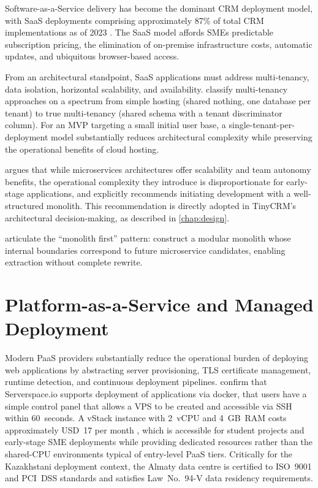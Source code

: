 Software-as-a-Service delivery has become the dominant CRM deployment
model, with SaaS deployments comprising approximately 87\% of total CRM
implementations as of 2023 \citep{gartner2023crm}. The SaaS model affords
SMEs predictable subscription pricing, the elimination of on-premise
infrastructure costs, automatic updates, and ubiquitous browser-based
access.

From an architectural standpoint, SaaS applications must address
multi-tenancy, data isolation, horizontal scalability, and availability.
\citet{bezemer2010} classify multi-tenancy approaches on a spectrum from
simple hosting (shared nothing, one database per tenant) to true
multi-tenancy (shared schema with a tenant discriminator column). For an
MVP targeting a small initial user base, a single-tenant-per-deployment
model substantially reduces architectural complexity while preserving the
operational benefits of cloud hosting.

\citet{richardson2018} argues that while microservices architectures offer
scalability and team autonomy benefits, the operational complexity they
introduce is disproportionate for early-stage applications, and explicitly
recommends initiating development with a well-structured monolith. This
recommendation is directly adopted in TinyCRM's architectural
decision-making, as described in \cref{chap:design}.

\citet{fowler2014microservices} articulate the ``monolith first'' pattern:
construct a modular monolith whose internal boundaries correspond to future
microservice candidates, enabling extraction without complete rewrite.

\section{Platform-as-a-Service and Managed Deployment}

Modern PaaS providers substantially reduce the operational burden of
deploying web applications by abstracting server provisioning, TLS
certificate management, runtime detection, and continuous deployment
pipelines. \citet{serverspacedocs2025} confirm that Serverspace.io supports
deployment of applications via docker, that users have a simple control panel 
that allows a VPS to be created and accessible via SSH within 60~seconds. 
A vStack instance with 2~vCPU and 4~GB~RAM costs approximately USD~17 per 
month \citep{serverspacedocs2025}, which is accessible for student projects 
and early-stage SME deployments while providing dedicated resources rather 
than the shared-CPU environments typical of entry-level PaaS tiers. Critically 
for the Kazakhstani deployment context, the Almaty data centre is certified 
to ISO~9001 and PCI~DSS standards and satisfies Law~No.~94-V data residency 
requirements.

